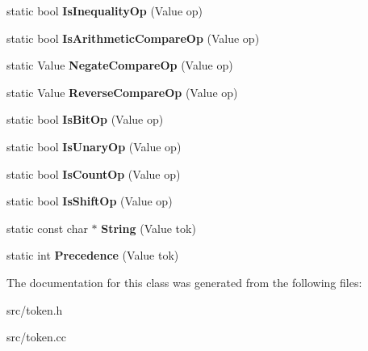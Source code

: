 \begin{DoxyCompactItemize}
\item 
\hypertarget{classv8_1_1internal_1_1_token_a116d1bf935776539ad65bc7a8c6104e1}{}static bool {\bfseries Is\+Inequality\+Op} (Value op)\label{classv8_1_1internal_1_1_token_a116d1bf935776539ad65bc7a8c6104e1}

\item 
\hypertarget{classv8_1_1internal_1_1_token_aed56f3d95c5f9029660176c492e25480}{}static bool {\bfseries Is\+Arithmetic\+Compare\+Op} (Value op)\label{classv8_1_1internal_1_1_token_aed56f3d95c5f9029660176c492e25480}

\item 
\hypertarget{classv8_1_1internal_1_1_token_abc75b08db16d9fba30c6de0f0f376c7f}{}static Value {\bfseries Negate\+Compare\+Op} (Value op)\label{classv8_1_1internal_1_1_token_abc75b08db16d9fba30c6de0f0f376c7f}

\item 
\hypertarget{classv8_1_1internal_1_1_token_aefbc3f71efb485c195118fdfea3e1684}{}static Value {\bfseries Reverse\+Compare\+Op} (Value op)\label{classv8_1_1internal_1_1_token_aefbc3f71efb485c195118fdfea3e1684}

\item 
\hypertarget{classv8_1_1internal_1_1_token_a95c7a019410d240107ca5d5dfecb696d}{}static bool {\bfseries Is\+Bit\+Op} (Value op)\label{classv8_1_1internal_1_1_token_a95c7a019410d240107ca5d5dfecb696d}

\item 
\hypertarget{classv8_1_1internal_1_1_token_a835fae2434bcf697c5100399ba6c662f}{}static bool {\bfseries Is\+Unary\+Op} (Value op)\label{classv8_1_1internal_1_1_token_a835fae2434bcf697c5100399ba6c662f}

\item 
\hypertarget{classv8_1_1internal_1_1_token_ab9a0e734a80e1d0101a0954891af333d}{}static bool {\bfseries Is\+Count\+Op} (Value op)\label{classv8_1_1internal_1_1_token_ab9a0e734a80e1d0101a0954891af333d}

\item 
\hypertarget{classv8_1_1internal_1_1_token_acecd1f2d38c6527d2a69cd000130c84c}{}static bool {\bfseries Is\+Shift\+Op} (Value op)\label{classv8_1_1internal_1_1_token_acecd1f2d38c6527d2a69cd000130c84c}

\item 
\hypertarget{classv8_1_1internal_1_1_token_a717701258769abde5d426045e1522ed7}{}static const char $\ast$ {\bfseries String} (Value tok)\label{classv8_1_1internal_1_1_token_a717701258769abde5d426045e1522ed7}

\item 
\hypertarget{classv8_1_1internal_1_1_token_a751b0771006175b14e3cb4ae0e74e27e}{}static int {\bfseries Precedence} (Value tok)\label{classv8_1_1internal_1_1_token_a751b0771006175b14e3cb4ae0e74e27e}

\end{DoxyCompactItemize}


The documentation for this class was generated from the following files\+:\begin{DoxyCompactItemize}
\item 
src/token.\+h\item 
src/token.\+cc\end{DoxyCompactItemize}
